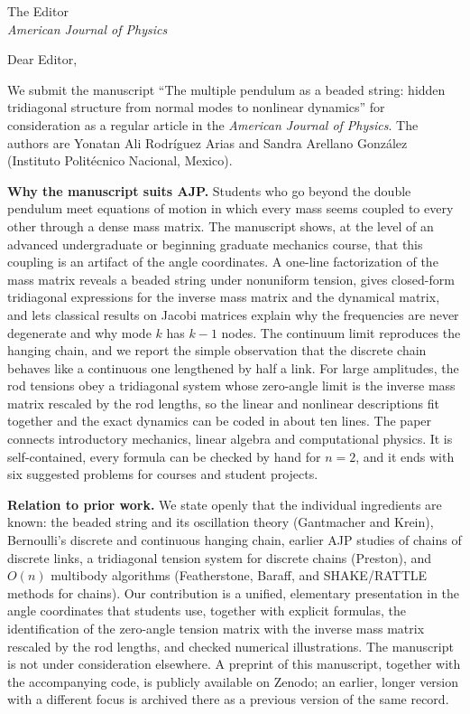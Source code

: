 \documentclass[11pt]{letter}
\date{\today}
\begin{document}
\begin{letter}{The Editor\\ \emph{American Journal of Physics}}
\opening{Dear Editor,}

We submit the manuscript ``The multiple pendulum as a beaded string: hidden tridiagonal structure from normal modes to nonlinear dynamics'' for consideration as a regular article in the \emph{American Journal of Physics}. The authors are Yonatan Ali Rodr\'iguez Arias and Sandra Arellano Gonz\'alez (Instituto Polit\'ecnico Nacional, Mexico).

\textbf{Why the manuscript suits AJP.} Students who go beyond the double pendulum meet equations of motion in which every mass seems coupled to every other through a dense mass matrix. The manuscript shows, at the level of an advanced undergraduate or beginning graduate mechanics course, that this coupling is an artifact of the angle coordinates. A one-line factorization of the mass matrix reveals a beaded string under nonuniform tension, gives closed-form tridiagonal expressions for the inverse mass matrix and the dynamical matrix, and lets classical results on Jacobi matrices explain why the frequencies are never degenerate and why mode $k$ has $k-1$ nodes. The continuum limit reproduces the hanging chain, and we report the simple observation that the discrete chain behaves like a continuous one lengthened by half a link. For large amplitudes, the rod tensions obey a tridiagonal system whose zero-angle limit is the inverse mass matrix rescaled by the rod lengths, so the linear and nonlinear descriptions fit together and the exact dynamics can be coded in about ten lines. The paper connects introductory mechanics, linear algebra and computational physics. It is self-contained, every formula can be checked by hand for $n=2$, and it ends with six suggested problems for courses and student projects.

\textbf{Relation to prior work.} We state openly that the individual ingredients are known: the beaded string and its oscillation theory (Gantmacher and Krein), Bernoulli's discrete and continuous hanging chain, earlier AJP studies of chains of discrete links, a tridiagonal tension system for discrete chains (Preston), and $O(n)$ multibody algorithms (Featherstone, Baraff, and SHAKE/RATTLE methods for chains). Our contribution is a unified, elementary presentation in the angle coordinates that students use, together with explicit formulas, the identification of the zero-angle tension matrix with the inverse mass matrix rescaled by the rod lengths, and checked numerical illustrations. The manuscript is not under consideration elsewhere. A preprint of this manuscript, together with the accompanying code, is publicly available on Zenodo; an earlier, longer version with a different focus is archived there as a previous version of the same record.


\end{letter}
\end{document}
